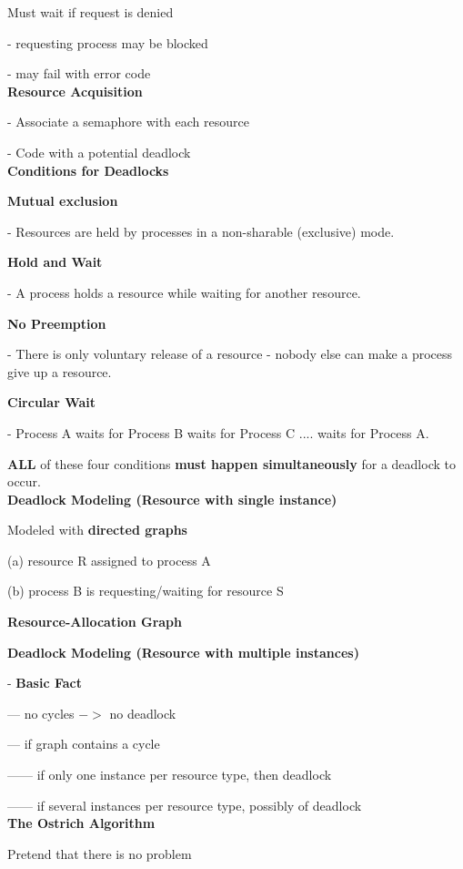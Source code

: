 \documentclass[]{report}
\begin{document}
Must wait if request is denied

- requesting process may be blocked

- may fail with error code\\

\textbf{Resource Acquisition}

- Associate a semaphore with each resource

- Code with a potential deadlock\\

\textbf{Conditions for Deadlocks}

\textbf{Mutual exclusion}

- Resources are held by processes in a non-sharable (exclusive) mode.

\textbf{Hold and Wait}

- A process holds a resource while waiting for another resource.

\textbf{No Preemption}

- There is only voluntary release of a resource - nobody else can make a process give up
a resource.

\textbf{Circular Wait}

- Process A waits for Process B waits for Process C .... waits for Process A.

\textbf{ALL} of these four conditions \textbf{must happen simultaneously} for a deadlock to occur.\\

\textbf{Deadlock Modeling
	(Resource with single instance)}

Modeled with \textbf{directed graphs}

(a) resource R assigned to process A

(b) process B is requesting/waiting for resource S

\textbf{Resource-Allocation Graph}

\textbf{Deadlock Modeling
(Resource with multiple instances)}

- \textbf{Basic Fact}

--- no cycles $->$ no deadlock

--- if graph contains a cycle

------ if only one instance per resource type, then deadlock

------ if several instances per resource type, possibly of deadlock\\

\textbf{The Ostrich Algorithm}

Pretend that there is no problem
\end{document}
